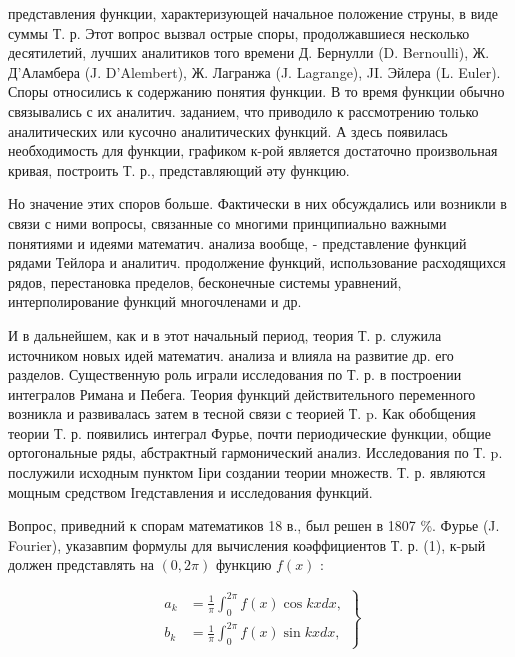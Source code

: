 \documentclass[10pt]{article}
\begin{document}
представления функции, характеризующей начальное положение струны, в виде суммы Т. р. Этот вопрос вызвал острые споры, продолжавшиеся несколько десятилетий, лучших аналитиков того времени Д. Бернулли (D. Bernoulli), Ж. Д'Аламбера (J. D'Alembert), Ж. Лагранжа (J. Lagrange), JI. Эйлера (L. Euler). Споры относились к содержанию понятия функции. В то время функции обычно связывались с их аналитич. заданием, что приводило к рассмотрению только аналитических или кусочно аналитических функций. А здесь появилась необходимость для функции, графиком к-рой является достаточно произвольная кривая, построить Т. р., представляющий әту функцию.



Но значение этих споров больше. Фактически в них обсуждались или возникли в связи с ними вопросы, связанные со многими принципиально важными понятиями и идеями математич. анализа вообще, - представление функций рядами Тейлора и аналитич. продолжение функций, использование расходящихся рядов, перестановка пределов, бесконечные системы уравнений, интерполирование функций многочленами и др.



И в дальнейшем, как и в этот начальный период, теория Т. р. служила источником новых идей математич. анализа и влияла на развитие др. его разделов. Существенную роль играли исследования по Т. р. в построении интегралов Римана и Пебега. Теория функций действительного переменного возникла и развивалась затем в тесной связи с теорией Т. p. Как обобщения теории Т. р. появились интеграл Фурье, почти периодические функции, общие ортогональные ряды, абстрактный гармонический анализ. Исследования по Т. p. послужили исходным пунктом Ііри создании теории множеств. Т. р. являются мощным средством Ігедставления и исследования функций.



Вопрос, приведний к спорам математиков 18 в., был решен в 1807 \%. Фурье (J. Fourier), указавпим формулы для вычисления коәффициентов Т. р. (1), к-рый должен представлять на $(0,2 \pi)$ функцию $f(x)$ :



\[

\left.\begin{array}{rl}

a_{k} & =\frac{1}{\pi} \int_{0}^{2 \pi} f(x) \cos k x d x, \\

b_{k} & =\frac{1}{\pi} \int_{0}^{2 \pi} f(x) \sin k x d x,

\end{array}\right\}

\]
\end{document}
